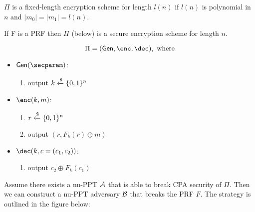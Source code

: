 $\Pi$ is a fixed-length encryption scheme for length $l(n)$ if $l(n)$ is polynomial in $n$ and $|m_0| = |m_1| = l(n)$.

\begin{theorem}
    If F is a PRF then $\Pi$ (below) is a secure encryption scheme for length $n$.

$$\Pi = (\gen, \enc, \dec), \text{ where}$$
    \begin{itemize}
        \item $\gen(\secparam)$:
        \begin{enumerate}
            \item output $k \xleftarrow{\$} \{0, 1\}^n$
        \end{enumerate}
        \item $\enc(k, m)$:
        \begin{enumerate}
            \item $r \xleftarrow{\$} \{0, 1\}^n$
            \item output $(r, F_k(r) \oplus m)$
        \end{enumerate}
        \item $\dec(k, c=(c_1, c_2))$:
        \begin{enumerate}
            \item output $c_2 \oplus F_k(c_1)$
        \end{enumerate}
    \end{itemize}
    
\end{theorem}

\proof
Assume there exists a nu-PPT $\mathcal{A}$ that is able to break CPA security of $\Pi$.
Then we can construct a nu-PPT adversary $\mathcal{B}$ that breaks the PRF $F$.
The strategy is outlined in the figure below:

